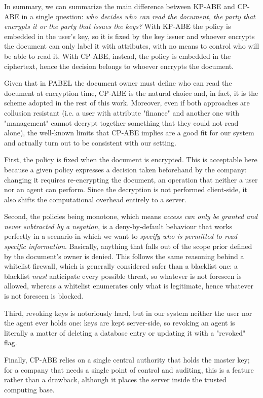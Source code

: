In summary, we can summarize the main difference between KP-ABE and CP-ABE in a single question: \textit{who decides who can read the document, the party that encrypts it or the party that issues the keys?}
With KP-ABE the policy is embedded in the user's key, so it is fixed by the key issuer and whoever encrypts the document can only label it with attributes, with no means to control who will be able to read it.
With CP-ABE, instead, the policy is embedded in the ciphertext, hence the decision belongs to whoever encrypts the document.

Given that in PABEL the document owner must define who can read the document at encryption time, CP-ABE is the natural choice and, in fact, it is the scheme adopted in the rest of this work.
Moreover, even if both approaches are collusion resistant (i.e. a user with attribute "finance" and another one with "management" cannot decrypt together something that they could not read alone), the well-known limits that CP-ABE implies are a good fit for our system and actually turn out to be consistent with our setting.

First, the policy is fixed when the document is encrypted. This is acceptable here because a given policy expresses a decision taken beforehand by the company: changing it requires re-encrypting the document, an operation that neither a user nor an agent can perform. Since the decryption is not performed client-side, it also shifts the computational overhead entirely to a server.

Second, the policies being monotone, which means \textit{access can only be granted and never subtracted by a negation}, is a deny-by-default behaviour that works perfectly in a scenario in which we want to \textit{specify who is permitted to read specific information}. Basically, anything that falls out of the scope prior defined by the document's owner is denied. This follows the same reasoning behind a whitelist firewall, which is generally considered safer than a blacklist one: a blacklist \textit{must} anticipate every possible threat, so whatever is not foreseen is allowed, whereas a whitelist enumerates only what is legitimate, hence whatever is not foreseen is blocked.

Third, revoking keys is notoriously hard, but in our system neither the user nor the agent ever holds one: keys are kept server-side, so revoking an agent is literally a matter of deleting a database entry or updating it with a "revoked" flag.

Finally, CP-ABE relies on a single central authority that holds the master key; for a company that needs a single point of control and auditing, this is a feature rather than a drawback, although it places the server inside the trusted computing base.

